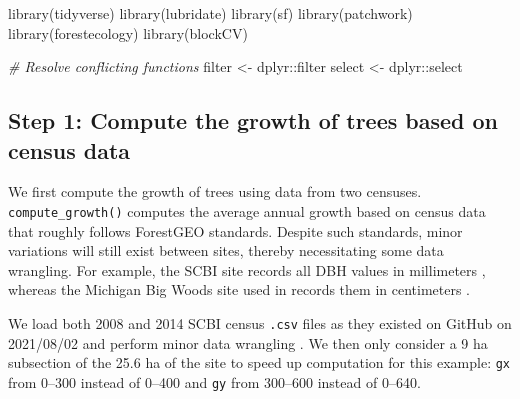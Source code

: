 \documentclass[12pt]{article}
\newenvironment{Shaded}{\begin{snugshade}}{\end{snugshade}}
\newcommand{\CommentTok}[1]{\textcolor[rgb]{0.56,0.35,0.01}{\textit{#1}}}
\newcommand{\FunctionTok}[1]{\textcolor[rgb]{0.00,0.00,0.00}{#1}}
\newcommand{\NormalTok}[1]{#1}
\newcommand{\OtherTok}[1]{\textcolor[rgb]{0.56,0.35,0.01}{#1}}
\newcommand{\SpecialCharTok}[1]{\textcolor[rgb]{0.00,0.00,0.00}{#1}}
\begin{document}
\begin{Shaded}
\begin{Highlighting}[]
\FunctionTok{library}\NormalTok{(tidyverse)}
\FunctionTok{library}\NormalTok{(lubridate)}
\FunctionTok{library}\NormalTok{(sf)}
\FunctionTok{library}\NormalTok{(patchwork)}
\FunctionTok{library}\NormalTok{(forestecology)}
\FunctionTok{library}\NormalTok{(blockCV)}

\CommentTok{\# Resolve conflicting functions}
\NormalTok{filter }\OtherTok{\textless{}{-}}\NormalTok{ dplyr}\SpecialCharTok{::}\NormalTok{filter}
\NormalTok{select }\OtherTok{\textless{}{-}}\NormalTok{ dplyr}\SpecialCharTok{::}\NormalTok{select}
\end{Highlighting}
\end{Shaded}

\hypertarget{compute-growth}{%
\subsection{Step 1: Compute the growth of trees based on census
data}\label{compute-growth}}

We first compute the growth of trees using data from two censuses.
\texttt{compute\_growth()} computes the average annual growth based on
census data that roughly follows ForestGEO standards. Despite such
standards, minor variations will still exist between sites, thereby
necessitating some data wrangling. For example, the SCBI site records
all DBH values in millimeters \citep{bourg_initial_2013}, whereas the
Michigan Big Woods site used in \citet{allen_permutation_2020} records
them in centimeters \citep{allen_michigan_2020}.

We load both 2008 and 2014 SCBI census \texttt{.csv} files as they
existed on GitHub on 2021/08/02 and perform minor data wrangling
\citep{gonzalez-akre_scbi-forestgeoscbi-forestgeo-data_2020}. We then
only consider a 9 ha subsection of the 25.6 ha of the site to speed up
computation for this example: \texttt{gx} from 0--300 instead of 0--400
and \texttt{gy} from 300--600 instead of 0--640.
\end{document}
